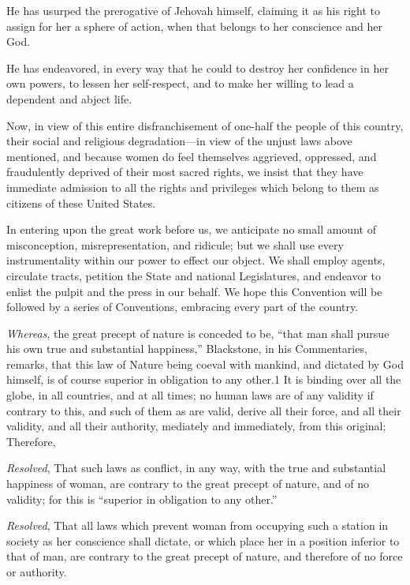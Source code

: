 \documentclass{article}
\begin{document}
He has usurped the prerogative of Jehovah himself, claiming it as his right to
assign for her a sphere of action, when that belongs to her conscience and her
God.

He has endeavored, in every way that he could to destroy her confidence in her
own powers, to lessen her self-respect, and to make her willing to lead a
dependent and abject life.

Now, in view of this entire disfranchisement of one-half the people of this
country, their social and religious degradation—in view of the unjust laws
above mentioned, and because women do feel themselves aggrieved, oppressed, and
fraudulently deprived of their most sacred rights, we insist that they have
immediate admission to all the rights and privileges which belong to them as
citizens of these United States.

In entering upon the great work before us, we anticipate no small amount of
misconception, misrepresentation, and ridicule; but we shall use every
instrumentality within our power to effect our object. We shall employ agents,
circulate tracts, petition the State and national Legislatures, and endeavor to
enlist the pulpit and the press in our behalf. We hope this Convention will be
followed by a series of Conventions, embracing every part of the country.

\clearpage

\textit{Whereas}, the great precept of nature is conceded to be, ``that man
shall pursue his own true and substantial happiness,'' Blackstone, in his
Commentaries, remarks, that this law of Nature being coeval with mankind, and
dictated by God himself, is of course superior in obligation to any other.1  It
is binding over all the globe, in all countries, and at all times; no human
laws are of any validity if contrary to this, and such of them as are valid,
derive all their force, and all their validity, and all their authority,
mediately and immediately, from this original; Therefore,

\textit{Resolved}, That such laws as conflict, in any way, with the true and
substantial happiness of woman, are contrary to the great precept of nature,
and of no validity; for this is ``superior in obligation to any other.''

\textit{Resolved}, That all laws which prevent woman from occupying such a
station in society as her conscience shall dictate, or which place her in a
position inferior to that of man, are contrary to the great precept of nature,
and therefore of no force or authority.
\end{document}
